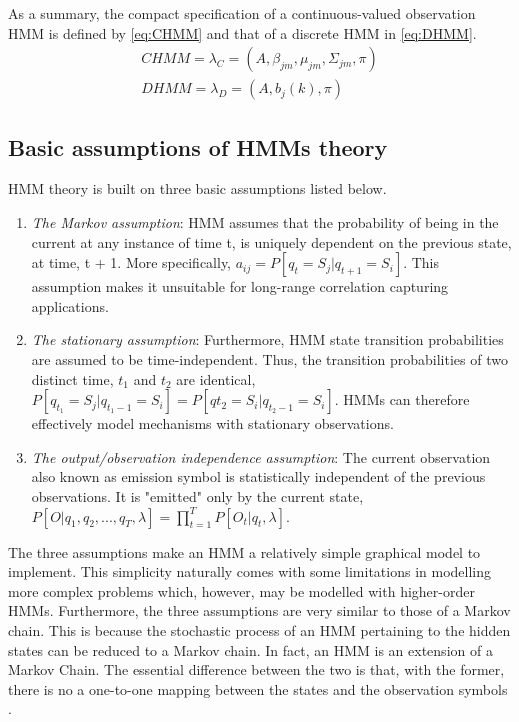 As a summary, the compact specification of a continuous-valued observation HMM is defined by \ref{eq:CHMM} and that of a discrete HMM in \ref{eq:DHMM}.
\begin{align} 
	CHMM = \lambda_C = (A, \beta_{jm}, \mu_{jm}, \Sigma_{jm}, \pi) \label{eq:CHMM} \\
	DHMM = \lambda_D = (A, b_j(k), \pi) \label{eq:DHMM}
\end{align}

\subsection{Basic assumptions of HMMs theory}
HMM theory is built on three basic assumptions listed below.
\begin{enumerate}
\label{con:markov} \item \textit{The Markov assumption}: HMM assumes that the probability of being in the current	at any instance of time t, is uniquely dependent on the previous state, at time, t + 1. More specifically, \(a_{ij} = P[q_t = S_j|q_{t+1}=S_i]\). This assumption makes it unsuitable for long-range correlation capturing applications.

\item \textit{The stationary assumption}: Furthermore, HMM state transition probabilities are assumed to be time-independent. Thus, the transition probabilities of two distinct time, \(t_1\) and \(t_2\) are identical, \(P[q_{t_1} = S_j|q_{t_1 -1} = S_i] = P[q{t_2}=S_i|q_{t_2-1} = S_i]\). HMMs can therefore effectively model mechanisms with stationary observations.

\item \textit{The output/observation independence assumption}: The current observation also known as emission symbol is statistically independent of the previous observations. It is "emitted" only by the current state, \(P[O|q_1, q_2, ..., q_T, \lambda]=\prod_{t=1}^{T}P[O_t|q_t, \lambda]\).
\end{enumerate} 
The three assumptions make an HMM a relatively simple graphical model to implement. This simplicity naturally comes with some limitations in modelling more complex problems which, however, may be modelled with higher-order HMMs. %
Furthermore, the three assumptions are very similar to those of a Markov chain. This is because the stochastic process of an HMM pertaining to the hidden states can be reduced to a Markov chain. In fact, an HMM is an extension of a Markov Chain. The essential difference between the two is that, with the former, there is no a one-to-one mapping between the states and the observation symbols \cite{biol1998}.

